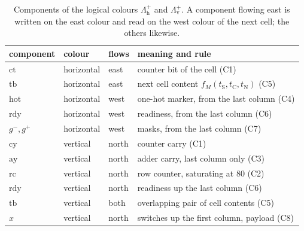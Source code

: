 \begin{table}[ht]
\centering
\small
\begin{tabularx}{\textwidth}{@{}l>{\raggedright\arraybackslash}p{2.0cm}>{\raggedright\arraybackslash}p{2.2cm}>{\raggedright\arraybackslash}X@{}}
\toprule
component & colour & flows & meaning and rule\\
\midrule
$\mathrm{ct}$ & horizontal & east & counter bit of the cell (C1)\\
$\mathrm{tb}$ & horizontal & east & next cell content $f_M(t_{\mathrm S},t_{\mathrm C},t_{\mathrm N})$ (C5)\\
$\mathrm{hot}$ & horizontal & west & one-hot marker, from the last column (C4)\\
$\mathrm{rdy}$ & horizontal & west & readiness, from the last column (C6)\\
$g^-,g^+$ & horizontal & west & masks, from the last column (C7)\\
$\mathrm{cy}$ & vertical & north & counter carry (C1)\\
$\mathrm{ay}$ & vertical & north & adder carry, last column only (C3)\\
$\mathrm{rc}$ & vertical & north & row counter, saturating at $80$ (C2)\\
$\mathrm{rdy}$ & vertical & north & readiness up the last column (C6)\\
$\mathrm{tb}$ & vertical & both & overlapping pair of cell contents (C5)\\
$x$ & vertical & north & switches up the first column, payload (C8)\\
\bottomrule
\end{tabularx}
\caption{Components of the logical colours $\Lambda^+_{\mathrm h}$ and $\Lambda^+_{\mathrm v}$. A component flowing east is written on the east colour and read on the west colour of the next cell; the others likewise.}
\label{tab:components}
\end{table}

